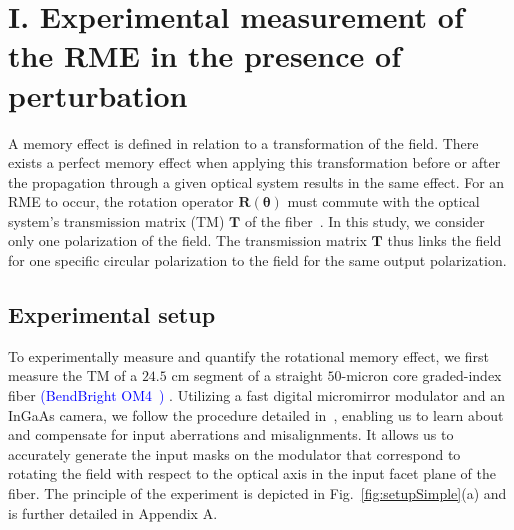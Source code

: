 \documentclass[aps,prl,twocolumn, amsmath,amssymb,superscriptaddress]{revtex4-2}
\newcommand{\red}[1]{\textcolor{red}{#1}}
\newcommand{\blue}[1]{\textcolor{blue}{#1}}
\begin{document}
\section{I. Experimental measurement of the RME in the presence of perturbation}


A memory effect is defined in relation to a transformation of the field.
There exists a perfect memory effect when applying this transformation
before or after the propagation through a given optical system results in the same effect.
For an RME to occur,
the rotation operator $\mathbf{R(\theta)}$ must commute
with the optical system's transmission matrix (TM) $\mathbf{T}$ of the fiber~\cite{Li2021memory}. 
In this study, we consider only one polarization of the field.
The transmission matrix $\mathbf{T}$ thus links the field for one specific circular polarization
to the field for the same output polarization.

\subsection{Experimental setup}

To experimentally measure and quantify the rotational memory effect,
we first measure the TM of a $24.5$ cm segment of a straight 
$50$-micron core graded-index fiber
\blue{
(BendBright OM4~\cite{bendbright_OM4})
}.
Utilizing a fast digital micromirror modulator and an InGaAs camera,
we follow the procedure detailed in~\cite{matthes2021learning},
enabling us to learn about and compensate for input aberrations and misalignments.
It allows us to accurately generate the input masks on the modulator that correspond to rotating the field
with respect to the optical axis in the input facet plane of the fiber.
The principle of the experiment is depicted in Fig.~\ref{fig:setupSimple}(a)
and is further detailed in Appendix A.
\end{document}
